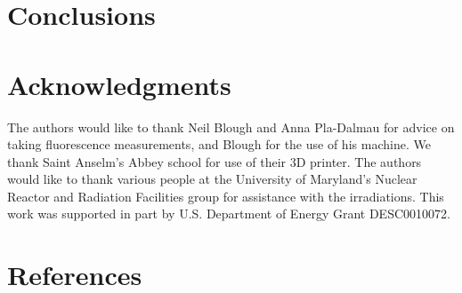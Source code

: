 \documentclass[review]{elsarticle}
\begin{document}
\section{Conclusions}

\section{Acknowledgments}
The authors would like to thank Neil Blough and Anna Pla-Dalmau for advice on taking fluorescence measurements, and Blough for the use of his machine. We thank Saint Anselm's Abbey school for use of their 3D printer.   
The authors would like to thank {\color{red} various people} at
the University of Maryland's Nuclear Reactor and Radiation
Facilities group for assistance
with the irradiations.
This work was supported in part by U.S. Department of Energy Grant DESC0010072.

\section*{References}


\end{document}
